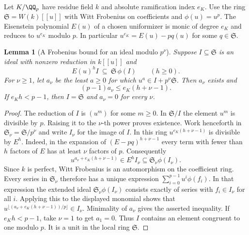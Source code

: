 \documentclass[a4paper,11pt]{article}
\newtheorem{lemma}[proposition]{Lemma}
\theoremstyle{definition}
\theoremstyle{remark}
\numberwithin{equation}{section}
\begin{document}
Let \(K/\QQ_p\) have residue field \(k\) and absolute ramification
index \(e_K\). Use the ring \(\mathfrak S=W(k)[[u]]\) with
Witt Frobenius on coefficients and \(\phi(u)=u^p\). The
Eisenstein polynomial \(E(u)\) of a chosen uniformizer is
monic of degree \(e_K\) and reduces to \(u^{e_K}\) modulo \(p\).
In particular \(u^{e_K}=E(u)-p q(u)\) for some \(q\in\mathfrak S\).

\begin{lemma}[A Frobenius bound for an ideal modulo \(p^\nu\)]
\leavevmode\label{lem:frobeniusideal759}
Suppose \(I\subseteq\mathfrak S\) is an ideal with nonzero
reduction in \(k[[u]]\) and
\[
                 E(u)^h I\ \subseteq\ \mathfrak S\,\phi(I)
                                    \qquad(h\ge0).
\]
For \(\nu\ge1\), let \(a_\nu\) be the least \(a\ge0\) for
which \(u^a\in I+p^\nu\mathfrak S\). Then \(a_\nu\) exists and
\[
                      (p-1)a_\nu\le e_K(h+\nu-1).
\]
If \(e_K h<p-1\), then \(I=\mathfrak S\) and \(a_\nu=0\)
for every \(\nu\).
\end{lemma}
\begin{proof}
The reduction of \(I\) is \((u^m)\) for some \(m\ge0\).
In \(\mathfrak S/I\) the element \(u^m\) is divisible by \(p\).
Raising it to the \(\nu\)-th power proves existence.
Work henceforth in \(\mathfrak S_\nu=\mathfrak S/p^\nu\)
and write \(I_\nu\) for the image of \(I\).
In this ring \(u^{e_K(h+\nu-1)}\) is divisible by \(E^h\).
Indeed, in the expansion of
\((E-pq)^{h+\nu-1}\) every term with fewer than \(h\) factors
of \(E\) has at least \(\nu\) factors of \(p\). Consequently
\[
       u^{a_\nu+e_K(h+\nu-1)}
                       \in E^h I_\nu\subseteq\mathfrak S_\nu\phi(I_\nu).
\]
Since \(k\) is perfect, Witt Frobenius is an automorphism on
the coefficient ring. Every series in \(\mathfrak S_\nu\)
therefore has a unique expression
\(\sum_{i=0}^{p-1}u^i\phi(f_i)\). In that expression the
extended ideal \(\mathfrak S_\nu\phi(I_\nu)\) consists exactly
of series with \(f_i\in I_\nu\) for all \(i\). Applying this
to the displayed monomial shows that
\(u^{\lfloor(a_\nu+e_K(h+\nu-1))/p\rfloor}\in I_\nu\).
Minimality of \(a_\nu\) gives the asserted inequality.
If \(e_Kh<p-1\), take \(\nu=1\) to get \(a_1=0\). Thus \(I\)
contains an element congruent to one modulo \(p\). It is a
unit in the local ring \(\mathfrak S\).
\end{proof}
\end{document}
